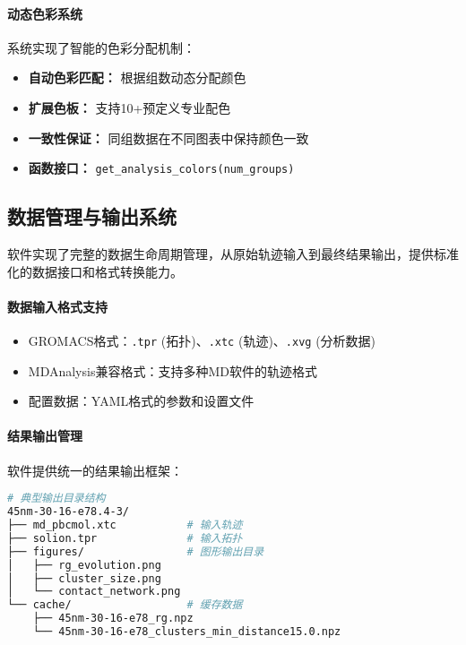 \paragraph{动态色彩系统}

系统实现了智能的色彩分配机制：
\begin{itemize}
    \item \textbf{自动色彩匹配：} 根据组数动态分配颜色
    \item \textbf{扩展色板：} 支持10+预定义专业配色
    \item \textbf{一致性保证：} 同组数据在不同图表中保持颜色一致
    \item \textbf{函数接口：} \lstinline|get_analysis_colors(num_groups)|
\end{itemize}

\subsection{数据管理与输出系统}
\label{subsec:data_management}

软件实现了完整的数据生命周期管理，从原始轨迹输入到最终结果输出，提供标准化的数据接口和格式转换能力。

\paragraph{数据输入格式支持}

\begin{itemize}
    \item GROMACS格式：\lstinline|.tpr| (拓扑)、\lstinline|.xtc| (轨迹)、\lstinline|.xvg| (分析数据)
    \item MDAnalysis兼容格式：支持多种MD软件的轨迹格式
    \item 配置数据：YAML格式的参数和设置文件
\end{itemize}

\paragraph{结果输出管理}

软件提供统一的结果输出框架：

\begin{lstlisting}[language=bash,style=blockstyle]
# 典型输出目录结构
45nm-30-16-e78.4-3/
├── md_pbcmol.xtc           # 输入轨迹
├── solion.tpr              # 输入拓扑
├── figures/                # 图形输出目录
│   ├── rg_evolution.png
│   ├── cluster_size.png
│   └── contact_network.png
└── cache/                  # 缓存数据
    ├── 45nm-30-16-e78_rg.npz
    └── 45nm-30-16-e78_clusters_min_distance15.0.npz
\end{lstlisting}

